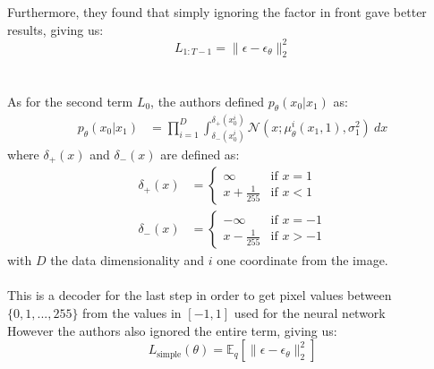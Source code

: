 \documentclass{article}
\begin{document}
Furthermore, they found that simply ignoring the factor in front gave better results, giving us:
\begin{equation}
  L_{1:T-1} = \| \epsilon - \epsilon_\theta \|_2^2
\end{equation}
\\\\
As for the second term $L_0$, the authors defined $p_\theta(x_0 | x_1)$ as:
\begin{align}
  p_\theta(x_0 | x_1) &= \prod_{i=1}^{D} \int_{\delta_{-} (x_0^i)}^{\delta_{+} (x_0^i)} \mathcal{N}(x; \mu_\theta^i (x_1, 1), \sigma^2_1) \: dx
\end{align}
\hspace{0.5cm} where $\delta_{+} (x)$ and $\delta_{-} (x)$ are defined as:
\begin{align}
  \delta_{+} (x) &= \begin{cases}
    \infty & \text{if } x = 1 \\
    x + \frac{1}{255} & \text{if } x < 1 
  \end{cases}\\
  \delta_{-} (x) &= \begin{cases}
    - \infty & \text{if } x = - 1 \\
    x - \frac{1}{255} & \text{if } x > -1 
  \end{cases}
\end{align}
\hspace{0.5cm} with $D$ the data dimensionality and $i$ one coordinate from the image.
\\\\
This is a decoder for the last step in order to get pixel values between $\{0, 1, ..., 255 \}$ from the values in $[-1, 1]$ used for the neural network \cite{ho2020denoising,nichol2021improved} \\
However the authors also ignored the entire term, giving us:
\begin{equation}
  L_{\text{simple}}(\theta) = \mathbb{E}_q \left[ \| \epsilon - \epsilon_\theta \|_2^2 \right]
\end{equation}
\end{document}
